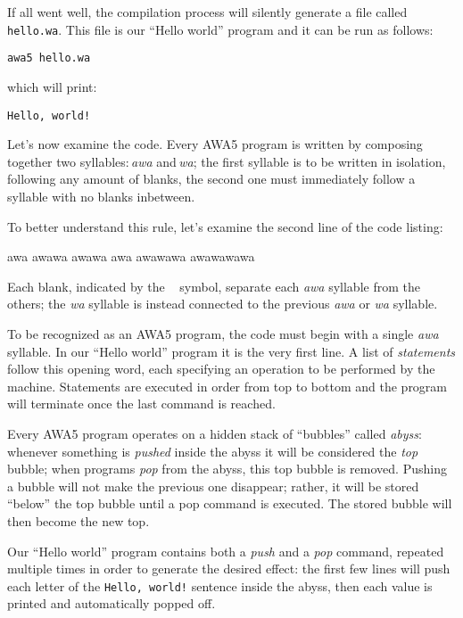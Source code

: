 \documentclass[11pt,a4paper,draft]{book}
\begin{document}
If all went well, the compilation process will silently generate a
file called \verb|hello.wa|. This file is our \enquote{Hello world}
program and it can be run as follows:
\begin{verbatim}
awa5 hello.wa
\end{verbatim}

which will print:
\begin{verbatim}
Hello, world!
\end{verbatim}

Let's now examine the code. Every AWA5 program is written by composing
together two syllables:\,\emph{awa} and\,\emph{wa}; the first syllable
is to be written in isolation, following any amount of blanks, the
second one must immediately follow a syllable with no blanks
inbetween.

To better understand this rule, let's examine the second line of the
code listing:
\begin{verbatim*}
awa awawa awawa awa awawawa awawawawa
\end{verbatim*}

Each blank, indicated by the \verb*| | symbol,
separate each \emph{awa} syllable from the others;
the \emph{wa} syllable is instead connected to the
previous \emph{awa} or \emph{wa} syllable.

To be recognized as an AWA5 program, the code must begin with a single
\emph{awa} syllable. In our \enquote{Hello world} program it is the
very first line. A list of \emph{statements} follow this opening word,
each specifying an operation to be performed by the
machine. Statements are executed in order from top to bottom and the
program will terminate once the last command is reached.

Every AWA5 program operates on a hidden stack of \enquote{bubbles}
called \emph{abyss}: whenever something is \emph{pushed} inside the
abyss it will be considered the \emph{top} bubble; when programs
\emph{pop} from the abyss, this top bubble is removed. Pushing a
bubble will not make the previous one disappear; rather, it will be
stored \enquote{below} the top bubble until a pop command is
executed. The stored bubble will then become the new top.

Our \enquote{Hello world} program contains both a \emph{push} and a
\emph{pop} command, repeated multiple times in order to generate the
desired effect: the first few lines will push each letter of the
\verb|Hello, world!| sentence inside the abyss, then each value is
printed and automatically popped off.
\end{document}
